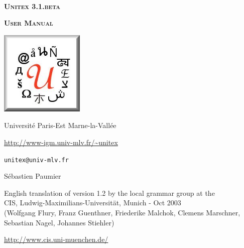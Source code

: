 
\begin{titlepage}
\begin{center}

~

\vspace{3cm}
\Huge
\textsc{\textbf{Unitex 3.1.beta}}

\vspace{1cm}

\huge
\textsc{\textbf{User Manual}}

\vspace{2cm}

  \begin{center}
    \includegraphics[width=4cm]{resources/img/logo-Unitex.png}
  \end{center}
\normalsize

\vspace{2cm}

\LARGE

Universit\'e Paris-Est Marne-la-Vall\'ee
\bigskip
\normalsize

\url{http://www-igm.univ-mlv.fr/~unitex}

\verb$unitex@univ-mlv.fr$

\vspace{1cm}

S\'ebastien Paumier
\bigskip

English translation of version 1.2 by the local grammar group at the\\
 CIS, Ludwig-Maximilians-Universit\"at, Munich - Oct 2003\\
 (Wolfgang Flury, Franz Guenthner, Friederike Malchok, Clemens Marschner, 
 Sebastian Nagel, Johannes Stiehler)

\url{http://www.cis.uni-muenchen.de/}
\end{center}

\end{titlepage}

